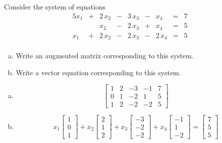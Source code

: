 
\begin{exerciseStatement}


 Consider the system of equations 
\begin{alignat*}{5} x_{1} &+& 2 \, x_{2} &-& 3 \, x_{3} &-& x_{4} &=& 7 \\ & & x_{2} &-& 2 \, x_{3} &+& x_{4} &=& 5 \\x_{1} &+& 2 \, x_{2} &-& 2 \, x_{3} &-& 2 \, x_{4} &=& 5 \\ \end{alignat*}
            


\begin{enumerate}[(a)]
\item  Write an augmented matrix corresponding to this system. 
\item  Write a vector equation corresponding to this system. 
\end{enumerate}
    
\end{exerciseStatement}
    
\begin{exerciseAnswer} 

\begin{enumerate}[(a)]
\item \[ \left[\begin{array}{cccc|c}
1 & 2 & -3 & -1 & 7 \\
0 & 1 & -2 & 1 & 5 \\
1 & 2 & -2 & -2 & 5
\end{array}\right] \]
\item \[ x_{1} \left[\begin{array}{c}
1 \\
0 \\
1
\end{array}\right] + x_{2} \left[\begin{array}{c}
2 \\
1 \\
2
\end{array}\right] + x_{3} \left[\begin{array}{c}
-3 \\
-2 \\
-2
\end{array}\right] + x_{4} \left[\begin{array}{c}
-1 \\
1 \\
-2
\end{array}\right] = \left[\begin{array}{c}
7 \\
5 \\
5
\end{array}\right] \]
\end{enumerate}
    
\end{exerciseAnswer}
    
